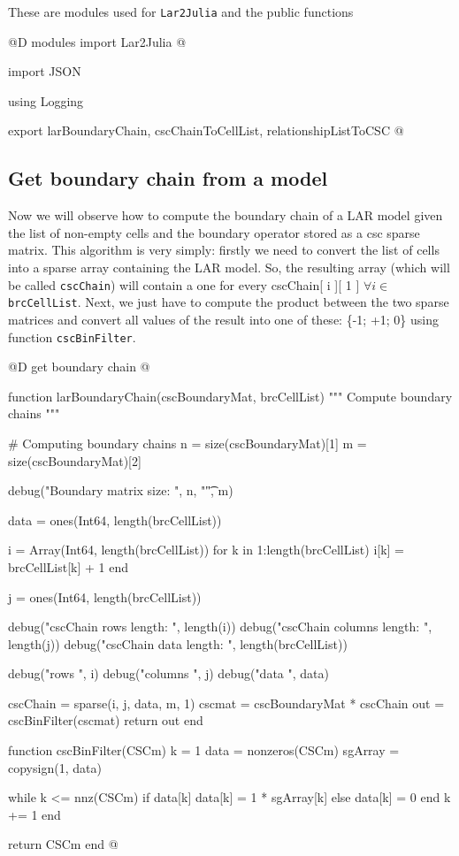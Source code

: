 \documentclass[11pt,oneside]{article}	%
\begin{document}
These are modules used for \texttt{Lar2Julia} and the public functions

@D modules import Lar2Julia
@{import JSON

using Logging

export larBoundaryChain, cscChainToCellList, relationshipListToCSC @}

\subsection{Get boundary chain from a model}\label{sec:boundaryChain}

Now we will observe how to compute the boundary chain of a LAR model given the list of non-empty cells and the boundary operator stored as a csc sparse matrix.
This algorithm is very simply: firstly we need to convert the list of cells into a sparse array containing the LAR model.
So, the resulting array (which will be called \texttt{cscChain}) will contain a one  for every cscChain[ i ][ 1 ] $\forall i \in$ \texttt{brcCellList}. Next, we just have to compute the product between the two sparse matrices and convert all values of the result into one of these: \{-1; +1; 0\} using function \texttt{cscBinFilter}.

@D get boundary chain
@{function larBoundaryChain(cscBoundaryMat, brcCellList)
  """
  Compute boundary chains
  """

  # Computing boundary chains
  n = size(cscBoundaryMat)[1]
  m = size(cscBoundaryMat)[2]

  debug("Boundary matrix size: ", n, "\t", m)

  data = ones(Int64, length(brcCellList))

  i = Array(Int64, length(brcCellList))
  for k in 1:length(brcCellList)
    i[k] = brcCellList[k] + 1
  end

  j = ones(Int64, length(brcCellList))

  debug("cscChain rows length: ", length(i))
  debug("cscChain columns length: ", length(j))
  debug("cscChain data length: ", length(brcCellList))

  debug("rows ", i)
  debug("columns ", j)
  debug("data ", data)

  cscChain = sparse(i, j, data, m, 1)
  cscmat = cscBoundaryMat * cscChain
  out = cscBinFilter(cscmat)
  return out
end

function cscBinFilter(CSCm)
  k = 1
  data = nonzeros(CSCm)
  sgArray = copysign(1, data)

  while k <= nnz(CSCm)
    if data[k] %
      data[k] = 1 * sgArray[k]
    else
      data[k] = 0
    end
    k += 1
  end

  return CSCm
end @}
\end{document}
